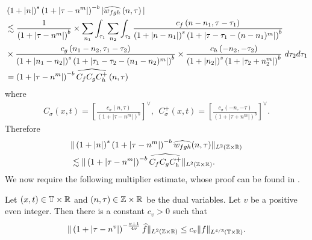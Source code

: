 \begin{equation*}
	\begin{split}
		& \left (1 + |n| \right )^s \left( 1 +  | \tau - n^{m }  | \right)^{-b} | 
		\widehat{w_{fgh}}\left( n, \tau \right) | 
		\\
    & \lesssim  \frac{1}{\left( 1 +
		| \tau - n^{m}| 
		\right)^{b}}  
		\times
    \sum_{n_{1} } \int_{\tau_{1}} \sum_{n_{2}}
    \int_{\tau_{2}} \frac{c_f\left( n - n_{1}, \tau - \tau_1 
		\right)}{\left (1 + |n - n_{1}| \right )^s \left( 1 + | \tau - \tau_1 - (n - n_{1})^{m} |
		\right)^{b}}
		\\
		& \times \frac{c_{g}\left( n_1 - n_2, \tau_1 - \tau_2 \right)}{\left (1 + |n_1 - n_2| \right ) 
		^s\left( 1 + | \tau_1 - \tau_2 -  (n_1 - n_2)^{m }| 
		\right)^{b}}
    \times \frac{c_{h}\left( -n_2, -\tau_2 \right)}{\left (1 + |n_2| \right )
    ^s\left( 1 + | \tau_2 + n_2^{m } | \right)^{b}} \ d \tau_2 d \tau_1 
    \\
		& = \left( 1 + | \tau - n^{m } | \right)^{-b}
		\widehat{C_f C_{g} C^+_{h}} \left( n, \tau \right)
	\end{split}
\end{equation*}
%
%
where
%
%
\begin{equation*}
	\begin{split}
		C_\sigma(x, t) = \left[ \frac{c_\sigma\left( n, \tau \right)}{\left( 
		1 + | \tau - n^{m } | \right)^{b}} \right]^\vee,
		\ \ C^+_\sigma(x, t) = \left[ \frac{c_\sigma\left( -n, -\tau \right)}{\left( 
		1 + | \tau + n^{m } | \right)^{b}} \right]^\vee.
	\end{split}
\end{equation*}
%
%
Therefore
%
%
\begin{equation}
	\label{ngen-holder-pre-estimate}
	\begin{split}
		& \| \left( 1 + |n | \right)^s
		\left( 1 + | \tau - n^{m } | \right)^{-b} \widehat{w_{fgh}}(n, 
		\tau)		
		\|_{L^2(\mathbb{Z} \times \mathbb{R})}
		\\
		& \lesssim \| \left( 1 + | \tau - n^{m } | \right)^{-b}
		\widehat{C_f C_{g} C^+_{h}} \|_{L^2(\mathbb{Z} \times \mathbb{R})}.
	\end{split}
\end{equation}
%
We now require the following multiplier estimate, whose proof can be found in 
\cite{Himonas:2001db}.
%
%
%
%
%
%
%
%
%
%
%
%
%
%
\begin{lemma}
	\label{nlem:four-mult-est-L4}
	Let $(x, t) \in \mathbb{T} \times \mathbb{R} $ and $(n, \tau) \in \mathbb{Z} \times \mathbb{R}$ be 
	the dual variables. Let $v$ be a positive even integer. Then there is a 
	constant $c_v > 0$ such that
%
%
\begin{equation}
	\label{nfour-mult-est-L4*}
	\begin{split}
		\| \left( 1 + | \tau - n^v | 
		\right)^{-\frac{v+1}{4v}}
		\widehat{f}\|_{L^2(\mathbb{Z} \times \mathbb{R})} \le c_v \|f \|_{L^{4/3}( \mathbb{T} \times \mathbb{R})}.
	\end{split}
\end{equation}
%
%
\end{lemma}
